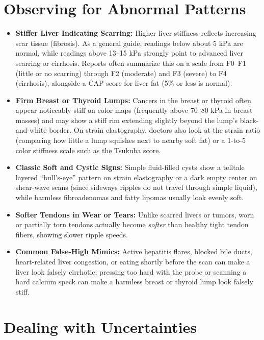 \section{Observing for Abnormal Patterns}

\begin{itemize}
    \item \textbf{Stiffer Liver Indicating Scarring:} Higher liver stiffness reflects increasing scar tissue (fibrosis). As a general guide, readings below about 5 kPa are normal, while readings above 13--15 kPa strongly point to advanced liver scarring or cirrhosis. Reports often summarize this on a scale from F0--F1 (little or no scarring) through F2 (moderate) and F3 (severe) to F4 (cirrhosis), alongside a CAP score for liver fat (5\% or less is normal).
    \item \textbf{Firm Breast or Thyroid Lumps:} Cancers in the breast or thyroid often appear noticeably stiff on color maps (frequently above 70--80 kPa in breast masses) and may show a stiff rim extending slightly beyond the lump's black-and-white border. On strain elastography, doctors also look at the strain ratio (comparing how little a lump squishes next to nearby soft fat) or a 1-to-5 color stiffness scale such as the Tsukuba score.
    \item \textbf{Classic Soft and Cystic Signs:} Simple fluid-filled cysts show a telltale layered ``bull's-eye'' pattern on strain elastography or a dark empty center on shear-wave scans (since sideways ripples do not travel through simple liquid), while harmless fibroadenomas and fatty lipomas usually look evenly soft.
    \item \textbf{Softer Tendons in Wear or Tears:} Unlike scarred livers or tumors, worn or partially torn tendons actually become \emph{softer} than healthy tight tendon fibers, showing slower ripple speeds.
    \item \textbf{Common False-High Mimics:} Active hepatitis flares, blocked bile ducts, heart-related liver congestion, or eating shortly before the scan can make a liver look falsely cirrhotic; pressing too hard with the probe or scanning a hard calcium speck can make a harmless breast or thyroid lump look falsely stiff.
\end{itemize}

\section{Dealing with Uncertainties}

